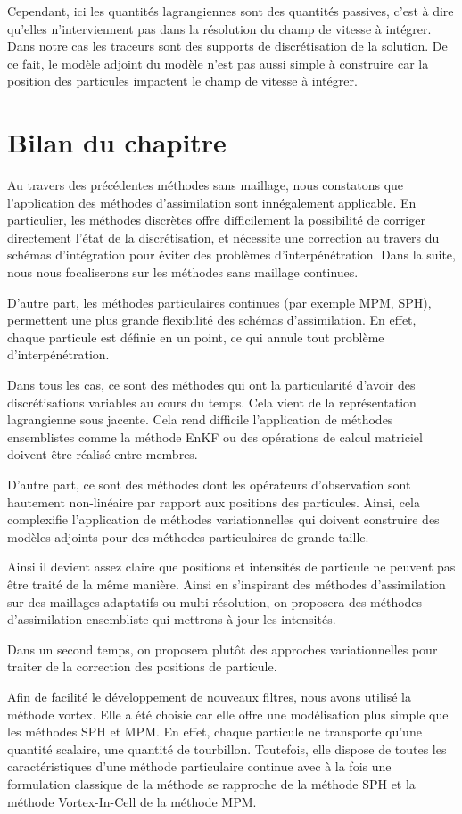 Cependant, ici les quantités lagrangiennes sont des quantités passives, c'est à dire qu'elles n'interviennent pas dans la résolution du champ de vitesse à intégrer. Dans notre cas les traceurs sont des supports de discrétisation de la solution. De ce fait, le modèle adjoint du modèle n'est pas aussi simple à construire car la position des particules impactent le champ de vitesse à intégrer.

\section{Bilan du chapitre}

Au travers des précédentes méthodes sans maillage, nous constatons que l'application des méthodes d'assimilation sont innégalement applicable. En particulier, les méthodes discrètes offre difficilement la possibilité de corriger directement l'état de la discrétisation, et nécessite une correction au travers du schémas d'intégration pour éviter des problèmes d'interpénétration. Dans la suite, nous nous focaliserons sur les méthodes sans maillage continues.

D'autre part, les méthodes particulaires continues (par exemple MPM, SPH), permettent une plus grande flexibilité des schémas d'assimilation. En effet, chaque particule est définie en un point, ce qui annule tout problème d'interpénétration.

Dans tous les cas, ce sont des méthodes qui ont la particularité d'avoir des discrétisations variables au cours du temps. Cela vient de la représentation lagrangienne sous jacente. Cela rend difficile l'application de méthodes ensemblistes comme la méthode EnKF ou des opérations de calcul matriciel doivent être réalisé entre membres.

D'autre part, ce sont des méthodes dont les opérateurs d'observation sont hautement non-linéaire par rapport aux positions des particules. Ainsi, cela complexifie l'application de méthodes variationnelles qui doivent construire des modèles adjoints pour des méthodes particulaires de grande taille.

Ainsi il devient assez claire que positions et intensités de particule ne peuvent pas être traité de la même manière. Ainsi en s'inspirant des méthodes d'assimilation sur des maillages adaptatifs ou multi résolution, on proposera des méthodes d'assimilation ensembliste qui mettrons à jour les intensités.

Dans un second temps, on proposera plutôt des approches variationnelles pour traiter de la correction des positions de particule.

Afin de facilité le développement de nouveaux filtres, nous avons utilisé la méthode vortex. Elle a été choisie car elle offre une modélisation plus simple que les méthodes SPH et MPM. En effet, chaque particule ne transporte qu'une quantité scalaire, une quantité de tourbillon. Toutefois, elle dispose de toutes les caractéristiques d'une méthode particulaire continue avec à la fois une formulation classique de la méthode se rapproche de la méthode SPH et la méthode Vortex-In-Cell de la méthode MPM.
